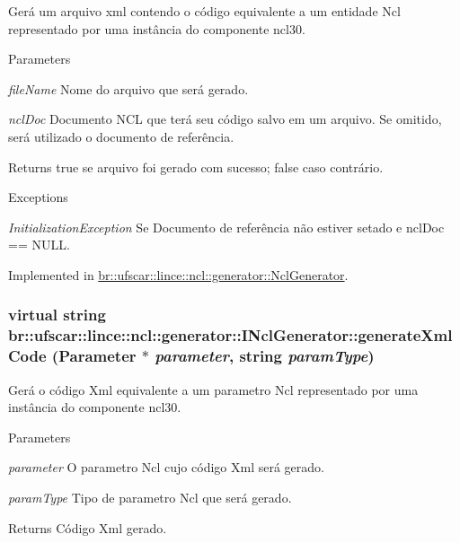 Gerá um arquivo xml contendo o código equivalente a um entidade Ncl representado por uma instância do componente ncl30. 


\begin{DoxyParams}{Parameters}
\item[{\em fileName}]Nome do arquivo que será gerado. \item[{\em nclDoc}]Documento NCL que terá seu código salvo em um arquivo. Se omitido, será utilizado o documento de referência. \end{DoxyParams}
\begin{DoxyReturn}{Returns}
true se arquivo foi gerado com sucesso; false caso contrário. 
\end{DoxyReturn}

\begin{DoxyExceptions}{Exceptions}
\item[{\em InitializationException}]Se Documento de referência não estiver setado e nclDoc == NULL. \end{DoxyExceptions}


Implemented in \hyperlink{classbr_1_1ufscar_1_1lince_1_1ncl_1_1generator_1_1NclGenerator_a2817848f6498deda5d5e22cf784907a0}{br::ufscar::lince::ncl::generator::NclGenerator}.

\hypertarget{classbr_1_1ufscar_1_1lince_1_1ncl_1_1generator_1_1INclGenerator_aa3110ec3a080b9d990c7b02dae573a85}{
\subsubsection[{generateXmlCode}]{\setlength{\rightskip}{0pt plus 5cm}virtual string br::ufscar::lince::ncl::generator::INclGenerator::generateXmlCode (Parameter $\ast$ {\em parameter}, \/  string {\em paramType})}}
\label{classbr_1_1ufscar_1_1lince_1_1ncl_1_1generator_1_1INclGenerator_aa3110ec3a080b9d990c7b02dae573a85}


Gerá o código Xml equivalente a um parametro Ncl representado por uma instância do componente ncl30. 


\begin{DoxyParams}{Parameters}
\item[{\em parameter}]O parametro Ncl cujo código Xml será gerado. \item[{\em paramType}]Tipo de parametro Ncl que será gerado. \end{DoxyParams}
\begin{DoxyReturn}{Returns}
Código Xml gerado. 
\end{DoxyReturn}

